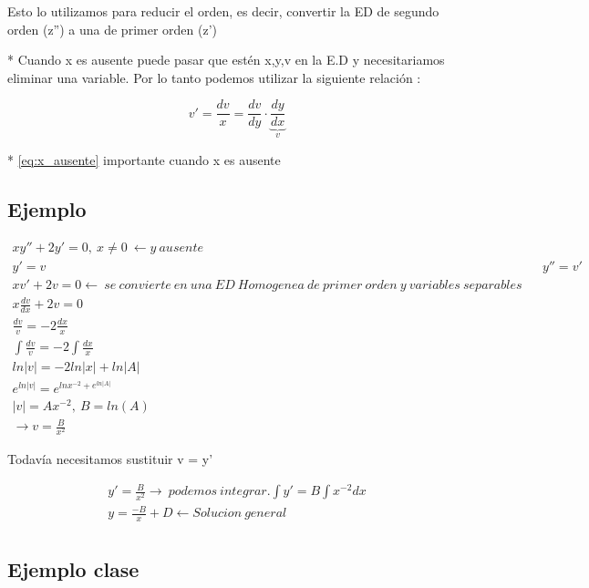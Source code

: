 \documentclass{article}
\begin{document}
Esto lo utilizamos para reducir el orden, es decir, convertir la ED de segundo orden  (z'') a una de primer orden (z')


* Cuando x es ausente puede pasar que estén  x,y,v en la E.D y necesitariamos eliminar una variable.
Por lo tanto podemos utilizar la siguiente relación :

\begin{equation}
v' = \frac{dv}{x} = \frac{dv}{dy} \cdot \underbrace{ \frac{dy}{dx} }_{v} \label{eq:x_ausente}
\end{equation}

*  \ref{eq:x_ausente} importante cuando x es ausente


\subsection{Ejemplo}

\begin{eqnarray}
\nonumber xy'' + 2y' = 0 , \ x \neq 0 \ \leftarrow y \ ausente\\
\nonumber y' = v &	& y'' = v' \\
\nonumber xv' +2v = 0 \leftarrow \  se \ convierte \ en \ una \ ED \ Homogenea \ de \ primer \ orden \ y \ variables \ separables \\
\nonumber x \frac{dv}{dx} + 2v = 0 \\
\nonumber \frac{dv}{v} = -2 \frac{dx}{x} \\
\nonumber \int \frac{dv}{v} = -2 \int \frac{dx}{x} \\
\nonumber ln |v| = -2 ln|x| + ln |A| \\ 
\nonumber e^{ln |v|} = e^{ln x^{-2} + e^{ln |A|}} \\
\nonumber |v| = Ax^{-2} , \ B = ln (A) \\
\nonumber \rightarrow v = \frac{B}{x^2}
\end{eqnarray}

Todavía necesitamos sustituir v = y'


\begin{eqnarray}
\nonumber y' = \frac{B}{x^2} \rightarrow \ podemos \ integrar.
\nonumber \int y'= B \int x^{-2} dx \\
\nonumber y = \frac{-B}{x} + D \leftarrow Solucion \ general \\ 
\end{eqnarray}

\subsection{Ejemplo clase}
\end{document}
